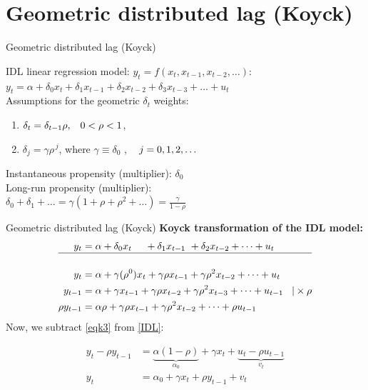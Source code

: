 \documentclass{beamer}
\begin{document}
\section{Geometric distributed lag (Koyck) }
\begin{frame}{Geometric distributed lag (Koyck) }

IDL linear regression model: $y_t = f(x_t, x_{t-1}, x_{t-2}, \dots)$: 
\\ \vspace{0.3cm}
$ y_t = \alpha + \delta_0 x_t + \delta_1 x_{t-1} + \delta_2 x_{t-2} + \delta_3 x_{t-3} 
+ \dots + u_t$ \\ \vspace{0.3cm}
Assumptions for the geometric $\delta_t$ weights:
\begin{enumerate}
\item $\delta_t = \delta_{t-1}\rho, \hspace{0.3cm} 0 < \rho < 1 $,
\item $ \delta_{j} = \gamma \rho^{\,j}$, \hspace{0.3cm} where $\gamma \equiv \delta_0$ , $\hspace{0.3cm} j=0,1,2,\dots $
\end{enumerate}
 
\vspace{0.3cm}
Instantaneous propensity (multiplier): $ \delta_0$ 
\\ \vspace{0.3cm}
Long-run propensity (multiplier):
\\ \vspace{0.3cm}
$\delta_0+\delta_1+\dots=\gamma(1+\rho+\rho^2+\dots)=\frac{\gamma}{1-\rho}$

\end{frame}
\begin{frame}{Geometric distributed lag (Koyck) }
\textbf{Koyck transformation of the IDL model:}
\begin{align} 
y_t & = \alpha + \delta_0 x_t \,\,\,\,\,\,\,\, + \delta_1 x_{t-1} \,\,+ \delta_2 x_{t-2} + \dots + u_t \notag \\
\hline \notag \\ 
y_t & = \alpha + \gamma (\rho^0) x_t + \gamma\rho x_{t-1} + \gamma\rho^2 x_{t-2}+\dots + u_t \label{IDL} \\ 
y_{t-1} & = \alpha + \gamma x_{t-1} + \gamma\rho x_{t-2} + \gamma\rho^2 x_{t-3} + \dots+u_{t-1} \hspace{0.3cm} |\times \rho 
\\ \label{eqk3}
\rho y_{t-1} & = \alpha\rho + \gamma\rho x_{t-1} + \gamma \rho^2 x_{t-2} + \dots + \rho u_{t-1}
\end{align}
\centering Now, we subtract \eqref{eqk3} from \eqref{IDL}: \par
\begin{align}
y_t-\rho y_{t-1} & = \underbrace{\alpha(1-\rho)}_{\alpha_{0}}+\gamma x_t + \underbrace{u_t-\rho u_{t-1}}_{v_t}\\
y_t & = \alpha_0 + \gamma x_t + \rho y_{t-1} + v_t \label{Koyck}
\end{align}
\end{frame}
\end{document}
